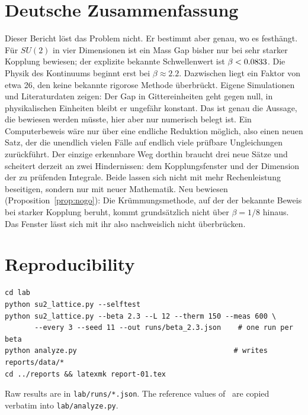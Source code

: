 \documentclass[11pt,a4paper]{article}
\begin{document}
\appendix
\section{Deutsche Zusammenfassung}
Dieser Bericht löst das Problem nicht. Er bestimmt aber genau, wo es festhängt. Für $SU(2)$ in vier Dimensionen ist ein Mass Gap bisher nur bei sehr starker Kopplung bewiesen; der explizite bekannte Schwellenwert ist $\beta<0.0833$. Die Physik des Kontinuums beginnt erst bei $\beta\approx2.2$. Dazwischen liegt ein Faktor von etwa 26, den keine bekannte rigorose Methode überbrückt. Eigene Simulationen und Literaturdaten zeigen: Der Gap in Gittereinheiten geht gegen null, in physikalischen Einheiten bleibt er ungefähr konstant. Das ist genau die Aussage, die bewiesen werden müsste, hier aber nur numerisch belegt ist. Ein Computerbeweis wäre nur über eine endliche Reduktion möglich, also einen neuen Satz, der die unendlich vielen Fälle auf endlich viele prüfbare Ungleichungen zurückführt. Der einzige erkennbare Weg dorthin braucht drei neue Sätze und scheitert derzeit an zwei Hindernissen: dem Kopplungsfenster und der Dimension der zu prüfenden Integrale. Beide lassen sich nicht mit mehr Rechenleistung beseitigen, sondern nur mit neuer Mathematik. Neu bewiesen (Proposition~\ref{prop:nogo}): Die Krümmungsmethode, auf der der bekannte Beweis bei starker Kopplung beruht, kommt grundsätzlich nicht über $\beta=1/8$ hinaus. Das Fenster lässt sich mit ihr also nachweislich nicht überbrücken.

\section{Reproducibility}\label{sec:repro}
\begin{verbatim}
cd lab
python su2_lattice.py --selftest
python su2_lattice.py --beta 2.3 --L 12 --therm 150 --meas 600 \
       --every 3 --seed 11 --out runs/beta_2.3.json    # one run per beta
python analyze.py                                     # writes reports/data/*
cd ../reports && latexmk report-01.tex
\end{verbatim}
Raw results are in \texttt{lab/runs/*.json}. The reference values of~\cite{AT21} are copied verbatim into \texttt{lab/analyze.py}.
\end{document}
